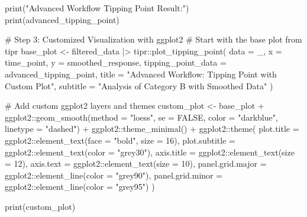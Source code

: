\documentclass[
  10pt,
  letterpaper,
  DIV=11,
  numbers=noendperiod]{scrartcl}
\newenvironment{Shaded}{\begin{snugshade}}{\end{snugshade}}
\newcommand{\AttributeTok}[1]{\textcolor[rgb]{0.40,0.45,0.13}{#1}}
\newcommand{\CommentTok}[1]{\textcolor[rgb]{0.37,0.37,0.37}{#1}}
\newcommand{\ConstantTok}[1]{\textcolor[rgb]{0.56,0.35,0.01}{#1}}
\newcommand{\DecValTok}[1]{\textcolor[rgb]{0.68,0.00,0.00}{#1}}
\newcommand{\FunctionTok}[1]{\textcolor[rgb]{0.28,0.35,0.67}{#1}}
\newcommand{\NormalTok}[1]{\textcolor[rgb]{0.00,0.23,0.31}{#1}}
\newcommand{\OtherTok}[1]{\textcolor[rgb]{0.00,0.23,0.31}{#1}}
\newcommand{\SpecialCharTok}[1]{\textcolor[rgb]{0.37,0.37,0.37}{#1}}
\newcommand{\StringTok}[1]{\textcolor[rgb]{0.13,0.47,0.30}{#1}}
\begin{document}
\begin{Shaded}
\begin{Highlighting}[]
\FunctionTok{print}\NormalTok{(}\StringTok{"Advanced Workflow Tipping Point Result:"}\NormalTok{)}
\FunctionTok{print}\NormalTok{(advanced\_tipping\_point)}

\CommentTok{\# Step 3: Customized Visualization with ggplot2}
\CommentTok{\# Start with the base plot from tipr}
\NormalTok{base\_plot }\OtherTok{\textless{}{-}}\NormalTok{ filtered\_data }\SpecialCharTok{|\textgreater{}}
\NormalTok{  tipr}\SpecialCharTok{::}\FunctionTok{plot\_tipping\_point}\NormalTok{(}
    \AttributeTok{data =}\NormalTok{ \_,}
    \AttributeTok{x =}\NormalTok{ time\_point,}
    \AttributeTok{y =}\NormalTok{ smoothed\_response,}
    \AttributeTok{tipping\_point\_data =}\NormalTok{ advanced\_tipping\_point,}
    \AttributeTok{title =} \StringTok{"Advanced Workflow: Tipping Point with Custom Plot"}\NormalTok{,}
    \AttributeTok{subtitle =} \StringTok{"Analysis of Category B with Smoothed Data"}
\NormalTok{  )}

\CommentTok{\# Add custom ggplot2 layers and themes}
\NormalTok{custom\_plot }\OtherTok{\textless{}{-}}\NormalTok{ base\_plot }\SpecialCharTok{+}
\NormalTok{  ggplot2}\SpecialCharTok{::}\FunctionTok{geom\_smooth}\NormalTok{(}\AttributeTok{method =} \StringTok{"loess"}\NormalTok{, }\AttributeTok{se =} \ConstantTok{FALSE}\NormalTok{, }\AttributeTok{color =} \StringTok{"darkblue"}\NormalTok{, }\AttributeTok{linetype =} \StringTok{"dashed"}\NormalTok{) }\SpecialCharTok{+}
\NormalTok{  ggplot2}\SpecialCharTok{::}\FunctionTok{theme\_minimal}\NormalTok{() }\SpecialCharTok{+}
\NormalTok{  ggplot2}\SpecialCharTok{::}\FunctionTok{theme}\NormalTok{(}
    \AttributeTok{plot.title =}\NormalTok{ ggplot2}\SpecialCharTok{::}\FunctionTok{element\_text}\NormalTok{(}\AttributeTok{face =} \StringTok{"bold"}\NormalTok{, }\AttributeTok{size =} \DecValTok{16}\NormalTok{),}
    \AttributeTok{plot.subtitle =}\NormalTok{ ggplot2}\SpecialCharTok{::}\FunctionTok{element\_text}\NormalTok{(}\AttributeTok{color =} \StringTok{"grey30"}\NormalTok{),}
    \AttributeTok{axis.title =}\NormalTok{ ggplot2}\SpecialCharTok{::}\FunctionTok{element\_text}\NormalTok{(}\AttributeTok{size =} \DecValTok{12}\NormalTok{),}
    \AttributeTok{axis.text =}\NormalTok{ ggplot2}\SpecialCharTok{::}\FunctionTok{element\_text}\NormalTok{(}\AttributeTok{size =} \DecValTok{10}\NormalTok{),}
    \AttributeTok{panel.grid.major =}\NormalTok{ ggplot2}\SpecialCharTok{::}\FunctionTok{element\_line}\NormalTok{(}\AttributeTok{color =} \StringTok{"grey90"}\NormalTok{),}
    \AttributeTok{panel.grid.minor =}\NormalTok{ ggplot2}\SpecialCharTok{::}\FunctionTok{element\_line}\NormalTok{(}\AttributeTok{color =} \StringTok{"grey95"}\NormalTok{)}
\NormalTok{  )}

\FunctionTok{print}\NormalTok{(custom\_plot)}
\end{Highlighting}
\end{Shaded}
\end{document}
